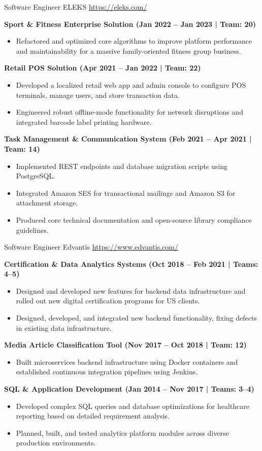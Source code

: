 \documentclass[a4paper, serif, 11pt]{moderncv}
\begin{document}
        {Software Engineer}
        {ELEKS}
        {\url{https://eleks.com/}}
        {}
        {\textbf{Sport \& Fitness Enterprise Solution (Jan 2022 – Jan 2023 | Team: 20)}
%
\begin{itemize}
\item Refactored and optimized core algorithms to improve platform performance and maintainability for a massive family-oriented fitness group business.
\end{itemize}
\textbf{Retail POS Solution (Apr 2021 – Jan 2022 | Team: 22)}
%
\begin{itemize}
\item Developed a localized retail web app and admin console to configure POS terminals, manage users, and store transaction data.
\item Engineered robust offline-mode functionality for network disruptions and integrated barcode label printing hardware.
\end{itemize}
\textbf{Task Management \& Communication System (Feb 2021 – Apr 2021 | Team: 14)}
%
\begin{itemize}
\item Implemented REST endpoints and database migration scripts using PostgreSQL.
\item Integrated Amazon SES for transactional mailings and Amazon S3 for attachment storage.
\item Produced core technical documentation and open-source library compliance guidelines.
\end{itemize}}

        {Software Engineer}
        {Edvantis}
        {\url{https://www.edvantis.com/}}
        {}
        {\textbf{Certification \& Data Analytics Systems (Oct 2018 – Feb 2021 | Teams: 4–5)}
%
\begin{itemize}
\item Designed and developed new features for backend data infrastructure and rolled out new digital certification programs for US clients.
\item Designed, developed, and integrated new backend functionality, fixing defects in existing data infrastructure.
\end{itemize}
\textbf{Media Article Classification Tool (Nov 2017 – Oct 2018 | Team: 12)}
%
\begin{itemize}
\item Built microservices backend infrastructure using Docker containers and established continuous integration pipelines using Jenkins.
\end{itemize}
\textbf{SQL \& Application Development (Jan 2014 – Nov 2017 | Teams: 3–4)}
%
\begin{itemize}
\item Developed complex SQL queries and database optimizations for healthcare reporting based on detailed requirement analysis.
\item Planned, built, and tested analytics platform modules across diverse production environments.
\end{itemize}}
\end{document}
